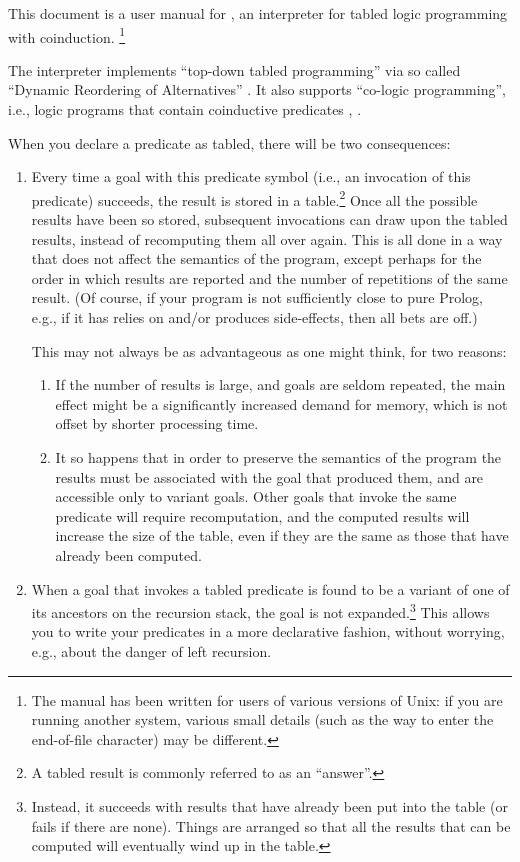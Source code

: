 
This document is a user manual for , an interpreter for tabled
logic programming with coinduction.%
\footnote{
  The manual has been written for users of various versions of Unix: if you
  are running another system, various small details (such as the way to enter
  the end-of-file character) may be different.}

The interpreter implements ``top-down tabled programming'' via so called
``Dynamic Reordering of Alternatives'' \cite{guo-gupta-dra}.  It also
supports ``co-logic programming'', i.e., logic programs that contain
coinductive predicates \cite{coinductive}, \cite{co-LP}.

\breakup

When you declare a predicate as tabled, there will be
two consequences:
\begin{enumerate}

\item Every time a goal with this predicate symbol (i.e., an invocation of
  this predicate) succeeds, the result is stored in a table.\footnote{
    A tabled result is commonly referred to as an ``answer''.}
  Once all the possible results have been so stored, subsequent invocations
  can draw upon the tabled results, instead of recomputing them all over
  again. This is all done in a way that does not affect the semantics of the
  program, except perhaps for the order in which results are reported and the
  number of repetitions of the same result. (Of course, if your program is
  not sufficiently close to pure Prolog, e.g., if it has relies on and/or
  produces side-effects, then all bets are off.)

  This may not always be as advantageous as one might think, for two reasons:
  \begin{enumerate}
  \item If the number of results is large, and goals are seldom repeated, the
    main effect might be a significantly increased demand for memory, which
    is not offset by shorter processing time.

  \item It so happens that in order to preserve the semantics of the program
    the results must be associated with the goal that produced them, and are
    accessible only to variant goals.  Other goals that invoke the same
    predicate will require recomputation, and the computed results will
    increase the size of the table, even if they are the same as those that
    have already been computed.
  \end{enumerate}

\item When a goal that invokes a tabled predicate is found to be a variant of
  one of its ancestors on the recursion stack, the goal is not
  expanded.\footnote{
    Instead, it succeeds with results that have already been put into the
    table (or fails if there are none).  Things are arranged so that all the
    results that can be computed will eventually wind up in the table.}
  This allows you to write your predicates in a more declarative fashion,
  without worrying, e.g., about the danger of left recursion.
\end{enumerate}
